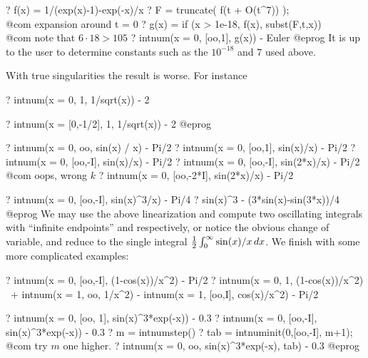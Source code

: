 \bprog
? f(x) = 1/(exp(x)-1)-exp(-x)/x
? F = truncate( f(t + O(t^7)) ); \\@com expansion around t = 0
? g(x) = if (x > 1e-18, f(x), subst(F,t,x))  \\@com note that $6 \cdot 18 > 105$
? intnum(x = 0, [oo,1],  g(x)) - Euler
@eprog\noindent
It is up to the user to determine constants such as the $10^{-18}$ and $7$
used above.

 With true singularities the result is worse.
For instance

\bprog
? intnum(x = 0, 1,  1/sqrt(x)) - 2

? intnum(x = [0,-1/2], 1,  1/sqrt(x)) - 2
@eprog


\bprog
? intnum(x = 0, oo, sin(x) / x) - Pi/2
? intnum(x = 0, [oo,1], sin(x)/x) - Pi/2
? intnum(x = 0, [oo,-I], sin(x)/x) - Pi/2
? intnum(x = 0, [oo,-I], sin(2*x)/x) - Pi/2  \\@com oops, wrong $k$
? intnum(x = 0, [oo,-2*I], sin(2*x)/x) - Pi/2

? intnum(x = 0, [oo,-I], sin(x)^3/x) - Pi/4
? sin(x)^3 - (3*sin(x)-sin(3*x))/4
@eprog\noindent
We may use the above linearization and compute two oscillating integrals with
``infinite endpoints'' \kbd{[oo, -I]} and \kbd{[oo, -3*I]} respectively, or
notice the obvious change of variable, and reduce to the single integral
${1\over 2}\int_0^\infty \sin(x)/x\,dx$. We finish with some more complicated
examples:

\bprog
? intnum(x = 0, [oo,-I], (1-cos(x))/x^2) - Pi/2
? intnum(x = 0, 1, (1-cos(x))/x^2) \
+ intnum(x = 1, oo, 1/x^2) - intnum(x = 1, [oo,I], cos(x)/x^2) - Pi/2

? intnum(x = 0, [oo, 1], sin(x)^3*exp(-x)) - 0.3
? intnum(x = 0, [oo,-I], sin(x)^3*exp(-x)) - 0.3
? m = intnumstep()
? tab = intnuminit(0,[oo,-I], m+1); \\@com try $m$ one higher.
? intnum(x = 0, oo, sin(x)^3*exp(-x), tab) - 0.3
@eprog

